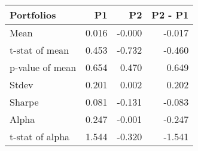 \begin{tabular}{lrrr}
\toprule
Portfolios & P1 & P2 & P2 - P1 \\
\midrule
Mean & 0.016 & -0.000 & -0.017 \\
t-stat of mean & 0.453 & -0.732 & -0.460 \\
p-value of mean & 0.654 & 0.470 & 0.649 \\
Stdev & 0.201 & 0.002 & 0.202 \\
Sharpe & 0.081 & -0.131 & -0.083 \\
Alpha & 0.247 & -0.001 & -0.247 \\
t-stat of alpha & 1.544 & -0.320 & -1.541 \\
\bottomrule
\end{tabular}
